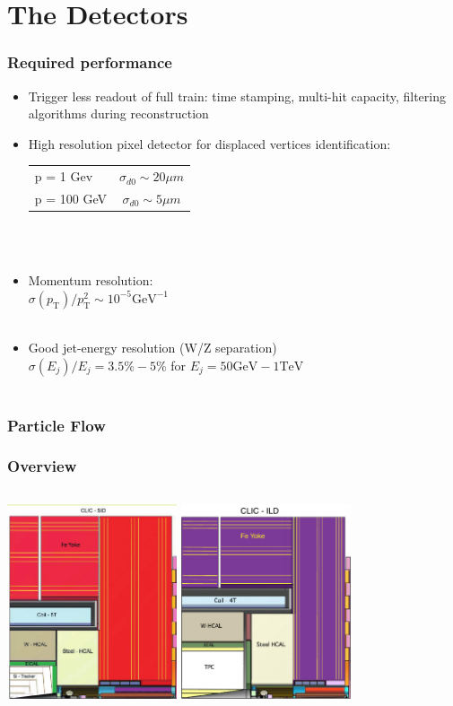 \documentclass{beamer}
\begin{document}
\section[Detectors]{The Detectors}
\begin{frame}
\frametitle{Required performance}
\begin{itemize}
  \item Trigger less readout of full train: time stamping, multi-hit capacity,
  filtering algorithms during reconstruction
  \item High resolution pixel detector for displaced vertices identification:\\
  {\scriptsize
  \begin{tabular}{lc}
  p = 1 Gev & $\sigma_{d0}\sim20\mu m$\\
  p = 100 GeV & $\sigma_{d0}\sim5\mu m$
  \end{tabular}
  }~\\ ~\\
  \item Momentum resolution:\\
  {\scriptsize 
  $\sigma(p_{\textrm{T}})/p_{\textrm{T}}^2\sim 10^{-5}\textrm{GeV}^{-1}$
   }~\\ ~\\
  \item Good jet-energy resolution (W/Z separation)\\
  {\scriptsize 
$\sigma(E_j)/E_j = 3.5\%-5\%$ for $E_j = 50\textrm{GeV}-1\textrm{TeV}$
  }~\\ ~\\
\end{itemize}
\end{frame}
\begin{frame}
\frametitle{Particle Flow}
\end{frame}
\begin{frame}
\frametitle{Overview}
\begin{columns}[c]
\column{6cm}
\centering
\includegraphics[width=5cm]{../SIDWorkshop/CLIC_SiD_xz.pdf}
\column{6cm}
\centering
\includegraphics[width=5cm]{../SIDWorkshop/CLIC_ILD_xz.pdf}
\end{columns}
\end{frame}
\end{document}
